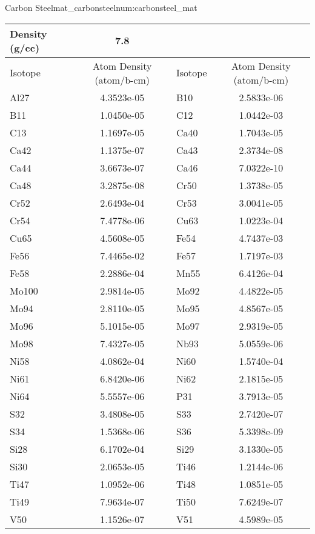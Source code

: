 \begin{matitem}{Carbon Steel}{mat_carbonsteel}{num:carbonsteel_mat}
  \centering
  \begin{tabular}{l c l c}
    \toprule
    Density (g/cc) & 7.8 \\
    \midrule
    Isotope & Atom Density (atom/b-cm) & Isotope & Atom Density (atom/b-cm) \\
    \midrule
    \midrule
Al27 & 4.3523e-05 & B10 & 2.5833e-06\\
B11 & 1.0450e-05 & C12 & 1.0442e-03\\
C13 & 1.1697e-05 & Ca40 & 1.7043e-05\\
Ca42 & 1.1375e-07 & Ca43 & 2.3734e-08\\
Ca44 & 3.6673e-07 & Ca46 & 7.0322e-10\\
Ca48 & 3.2875e-08 & Cr50 & 1.3738e-05\\
Cr52 & 2.6493e-04 & Cr53 & 3.0041e-05\\
Cr54 & 7.4778e-06 & Cu63 & 1.0223e-04\\
Cu65 & 4.5608e-05 & Fe54 & 4.7437e-03\\
Fe56 & 7.4465e-02 & Fe57 & 1.7197e-03\\
Fe58 & 2.2886e-04 & Mn55 & 6.4126e-04\\
Mo100 & 2.9814e-05 & Mo92 & 4.4822e-05\\
Mo94 & 2.8110e-05 & Mo95 & 4.8567e-05\\
Mo96 & 5.1015e-05 & Mo97 & 2.9319e-05\\
Mo98 & 7.4327e-05 & Nb93 & 5.0559e-06\\
Ni58 & 4.0862e-04 & Ni60 & 1.5740e-04\\
Ni61 & 6.8420e-06 & Ni62 & 2.1815e-05\\
Ni64 & 5.5557e-06 & P31 & 3.7913e-05\\
S32 & 3.4808e-05 & S33 & 2.7420e-07\\
S34 & 1.5368e-06 & S36 & 5.3398e-09\\
Si28 & 6.1702e-04 & Si29 & 3.1330e-05\\
Si30 & 2.0653e-05 & Ti46 & 1.2144e-06\\
Ti47 & 1.0952e-06 & Ti48 & 1.0851e-05\\
Ti49 & 7.9634e-07 & Ti50 & 7.6249e-07\\
V50 & 1.1526e-07 & V51 & 4.5989e-05\\

    \bottomrule
  \end{tabular}
\end{matitem}
